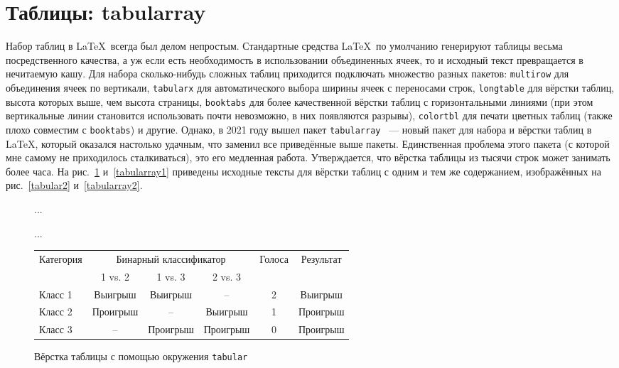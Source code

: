 \documentclass[a4paper,12pt,hyphens]{article}
\newcommand\package[1]{\texttt{#1}}
\begin{document}
\section{Таблицы: tabularray}
Набор таблиц в \LaTeX\ всегда был делом непростым. Стандартные средства \LaTeX\ по умолчанию генерируют таблицы весьма посредственного качества, а уж если есть необходимость в использовании объединенных ячеек, то и исходный текст превращается в нечитаемую кашу. Для набора сколько-нибудь сложных таблиц приходится подключать множество разных пакетов: \package{multirow} \parencite{ctan-multirow} для объединения ячеек по вертикали, \package{tabularx} \parencite{ctan-tabularx} для автоматического выбора ширины ячеек с переносами строк, \package{longtable} \parencite{ctan-longtable} для вёрстки таблиц, высота которых выше, чем высота страницы, \package{booktabs} \parencite{ctan-booktabs} для более качественной вёрстки таблиц с горизонтальными линиями (при этом вертикальные линии становится использовать почти невозможно, в них появляются разрывы), \package{colortbl} \parencite{ctan-colortbl} для печати цветных таблиц (также плохо совместим с \package{booktabs}) и другие. Однако, в 2021 году вышел пакет \package{tabularray} \parencite{ctan-tabularray}~--- новый пакет для набора и вёрстки таблиц в \LaTeX, который оказался настолько удачным, что заменил все приведённые выше пакеты. Единственная проблема этого пакета (с которой мне самому не приходилось сталкиваться), это его медленная работа. Утверждается, что вёрстка таблицы из тысячи строк может занимать более часа. На рис.~\ref{tabular1} и~\ref{tabularray1} приведены исходные тексты для вёрстки таблиц с одним и тем же содержанием, изображённых на рис.~\ref{tabular2} и~\ref{tabularray2}.%
\begin{figure}[tp]
\begin{latexcode}
...
\usepackage{booktabs}
\usepackage{multirow}
...
\begin{tabular}{lccccc}
\toprule
\multirow{2}{*}[-0.5ex]{Категория} & \multicolumn{3}{c}{Бинарный классификатор} &
\multirow{2}{*}[-0.5ex]{Голоса} & \multirow{2}{*}[-0.5ex]{Результат} \\
\cmidrule(lr){2-4}
        & 1 vs. 2  & 1 vs. 3  & 2 vs. 3  \\
\midrule
Класс 1 & Выигрыш  & Выигрыш  & --       & 2 & Выигрыш \\ 
Класс 2 & Проигрыш & --       & Выигрыш  & 1 & Проигрыш \\ 
Класс 3 & --       & Проигрыш & Проигрыш & 0 & Проигрыш \\ 
\bottomrule
\end{tabular}
\end{latexcode}
\caption{Вёрстка таблицы с помощью окружения \package{tabular}}\label{tabular1}
\end{figure}%
\end{document}
